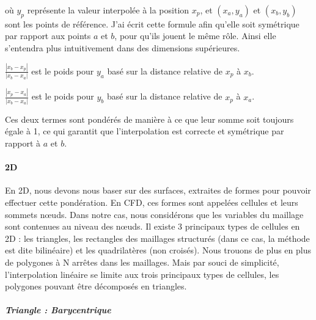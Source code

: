 où \( y_p \) représente la valeur interpolée à la position \( x_p \), et \((x_a, y_a)\) et \((x_b, y_b)\) sont les points de référence. J'ai écrit cette formule afin qu'elle soit symétrique par rapport aux points \( a \) et \( b \), pour qu'ils jouent le même rôle. Ainsi elle s'entendra plus intuitivement dans des dimensions supérieures.
\vspace{0.5cm}

        \( \frac{|x_b - x_p|}{|x_b - x_a|} \) est le poids pour \( y_a \) basé sur la distance relative de \( x_p \) à \( x_b \).

        \( \frac{|x_p - x_a|}{|x_b - x_a|} \) est le poids pour \( y_b \) basé sur la distance relative de \( x_p \) à \( x_a \).\vspace{0.5cm}

Ces deux termes sont pondérés de manière à ce que leur somme soit toujours égale à 1, ce
qui garantit que l'interpolation est correcte et symétrique par rapport à \( a \) et \( b \).\vspace{0.5cm}


\paragraph{2D}

\vspace{0.5cm}

En 2D, nous devons nous baser sur des surfaces, extraites de formes pour pouvoir effectuer cette pondération. En CFD, ces formes sont appelées cellules et leurs sommets nœuds. Dans notre cas, nous considérons que les variables du maillage sont contenues au niveau des nœuds. 
Il existe 3 principaux types de cellules en 2D : les triangles, les rectangles des maillages structurés (dans ce cas, la méthode est dite bilinéaire) et les quadrilatères (non croisés).
Nous trouons de plus en plus de polygones à N arrêtes dans les maillages. Mais par souci de simplicité, l'interpolation linéaire se limite aux trois principaux types de cellules, les polygones pouvant être décomposés en triangles. %

\subparagraph{Triangle : Barycentrique}

